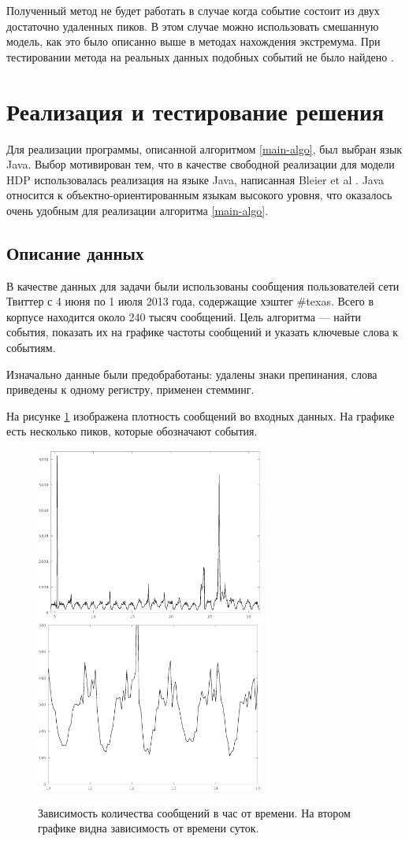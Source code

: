 \documentclass[12pt, a4paper]{article}
\begin{document}
  Полученный метод не будет работать в случае когда событие состоит из двух достаточно удаленных пиков. В этом случае можно использовать смешанную модель, как это было описанно выше в методах нахождения экстремума. При тестировании метода на реальных данных подобных событий не было найдено \cite{blei-sd}.
  

  \section{Реализация и тестирование решения}
  Для реализации программы, описанной алгоритмом \ref{main-algo}, был выбран язык Java. Выбор мотивирован тем, что в качестве свободной реализации для модели HDP использовалась реализация на языке Java, написанная Bleier et al \cite{hdp-2}. Java относится к объектно-ориентированным языкам высокого уровня, что оказалось очень удобным для реализации алгоритма \ref{main-algo}.
  
  \subsection{Описание данных}
  В качестве данных для задачи были использованы сообщения пользователей сети Твиттер с 4 июня по 1 июля 2013 года, содержащие хэштег \#texas. Всего в корпусе находится около 240 тысяч сообщений. Цель алгоритма --- найти события, показать их на графике частоты сообщений и указать ключевые слова к событиям.
  
  Изначально данные были предобработаны: удалены знаки препинания, слова приведены к одному регистру, применен стемминг.
  
  На рисунке \ref{fig:all-freq} изображена плотность сообщений во входных данных. На графике есть несколько пиков, которые обозначают события. 
  \begin{figure}[H]
  \centering
  \includegraphics[width=7.5cm]{all-freq.eps}
  \includegraphics[width=7.5cm]{all-freq-scaled.eps}
  \caption{Зависимость количества сообщений в час от времени. На втором графике видна зависимость от времени суток.}
  \label{fig:all-freq}
  \end{figure}
  
\end{document}
